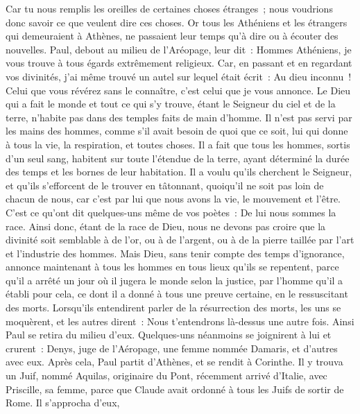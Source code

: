 \begin{multicols}{2}
Car tu nous remplis les oreilles de certaines choses étranges~; nous voudrions donc savoir ce que veulent dire ces choses.
Or tous les Athéniens et les étrangers qui demeuraient à Athènes, ne passaient leur temps qu'à dire ou à écouter des nouvelles.
Paul, debout au milieu de l'Aréopage, leur dit~: Hommes Athéniens, je vous trouve à tous égards extrêmement religieux.
Car, en passant et en regardant vos divinités, j'ai même trouvé un autel sur lequel était écrit~: Au dieu inconnu~! Celui que vous révérez sans le connaître, c'est celui que je vous annonce.
Le Dieu qui a fait le monde et tout ce qui s'y trouve, étant le Seigneur du ciel et de la terre, n'habite pas dans des temples faits de main d'homme.
Il n'est pas servi par les mains des hommes, comme s'il avait besoin de quoi que ce soit, lui qui donne à tous la vie, la respiration, et toutes choses.
Il a fait que tous les hommes, sortis d'un seul sang, habitent sur toute l'étendue de la terre, ayant déterminé la durée des temps et les bornes de leur habitation.
Il a voulu qu'ils cherchent le Seigneur, et qu'ils s'efforcent de le trouver en tâtonnant, quoiqu'il ne soit pas loin de chacun de nous,
car c'est par lui que nous avons la vie, le mouvement et l'être. C'est ce qu'ont dit quelques-uns même de vos poètes~: De lui nous sommes la race.
Ainsi donc, étant de la race de Dieu, nous ne devons pas croire que la divinité soit semblable à de l'or, ou à de l'argent, ou à de la pierre taillée par l'art et l'industrie des hommes.
Mais Dieu, sans tenir compte des temps d'ignorance, annonce maintenant à tous les hommes en tous lieux qu'ils se repentent,
parce qu'il a arrêté un jour où il jugera le monde selon la justice, par l'homme qu'il a établi pour cela, ce dont il a donné à tous une preuve certaine, en le ressuscitant des morts.
Lorsqu'ils entendirent parler de la résurrection des morts, les uns se moquèrent, et les autres dirent~: Nous t'entendrons là-dessus une autre fois.
Ainsi Paul se retira du milieu d'eux.
Quelques-uns néanmoins se joignirent à lui et crurent~: Denys, juge de l'Aéropage, une femme nommée Damaris, et d'autres avec eux.
\VerseOne{}Après cela, Paul partit d'Athènes, et se rendit à Corinthe.
Il y trouva un Juif, nommé Aquilas, originaire du Pont, récemment arrivé d'Italie, avec Priscille, sa femme, parce que Claude avait ordonné à tous les Juifs de sortir de Rome. Il s'approcha d'eux,

\end{multicols}
